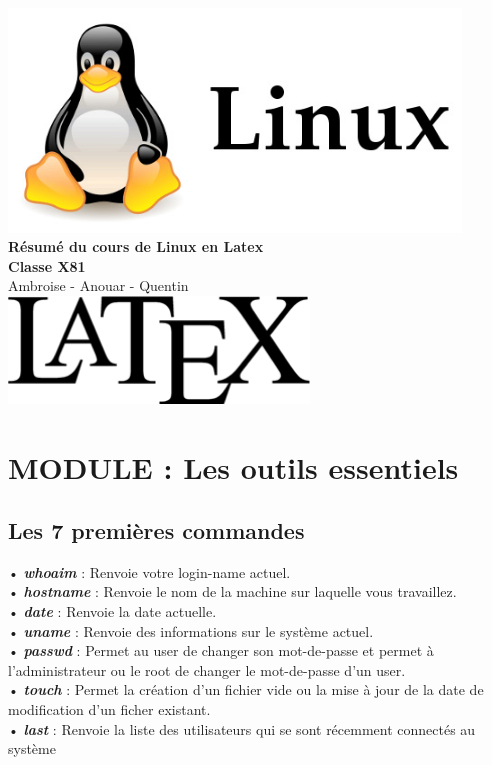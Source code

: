\documentclass[a4paper, 11pt, french, oneside]{book}
\begin{document}
  
 \begin{titlepage}
  \begin{center}
   \includegraphics[width=12cm]{linux.jpg}%
   \hspace{60pt}%
   \vspace{50pt}%
   \LARGE
   \textbf{Résumé du cours de Linux en Latex}\\
   \color{red}
   \textbf{Classe X81}\\
   Ambroise - Anouar - Quentin\\
   \vspace{50pt}%
   \includegraphics[width=8cm]{latex.jpg}%
  \end{center}
 \end{titlepage}
      
   \tableofcontents
   \frontmatter
   \mainmatter
 \chapter{MODULE : Les outils essentiels}
  \section{\Large  Les 7 premières commandes}
   \begin{flushleft}
    • \textbf {\textit{\color{red}whoaim}} : Renvoie votre login-name actuel.\\
    • \textbf {\textit{\color{red}hostname}} : Renvoie le nom de la machine sur laquelle vous travaillez.\\
    • \textbf {\textit{\color{red}date}} : Renvoie la date actuelle.\\
    • \textbf {\textit{\color{red}uname}} : Renvoie des informations sur le système actuel.\\
    • \textbf{\textit{\color{red}passwd}} : Permet au user de changer son mot-de-passe et permet à     l’administrateur ou le root de changer le mot-de-passe d’un user.\\
    • \textbf{\textit{\color{red}touch}} : Permet la création d’un fichier vide ou la mise à jour de la date de modification d’un ficher existant.\\
    • \textbf{\textit{\color{red}last}} : Renvoie la liste des utilisateurs qui se sont récemment connectés au système\\
   \end{flushleft}      
\end{document}
